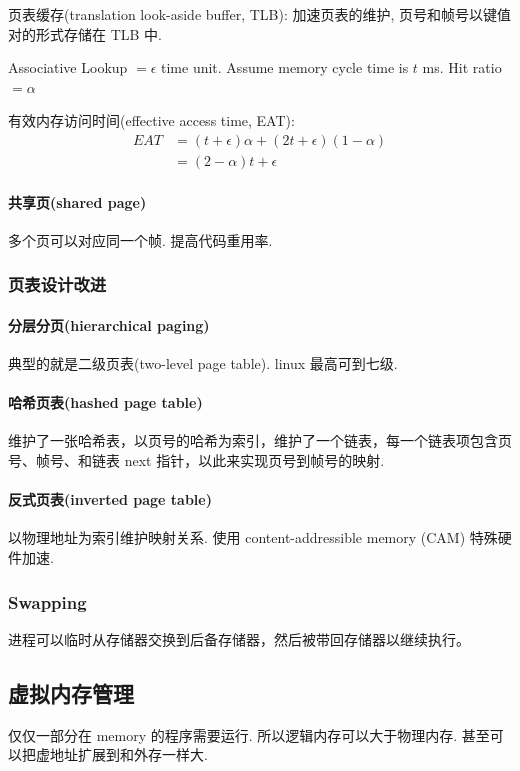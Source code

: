 页表缓存(translation look-aside buffer, TLB): 加速页表的维护, 页号和帧号以键值对的形式存储在 TLB 中. 

Associative Lookup $=\epsilon$ time unit. Assume memory cycle time is $t$ ms. Hit ratio $=\alpha$

有效内存访问时间(effective access time, EAT):
\begin{align*}
    EAT &= (t+\epsilon)\alpha+(2t+\epsilon)(1-\alpha)\\
    &=(2-\alpha)t+\epsilon 
\end{align*}


\paragraph{共享页(shared page)}多个页可以对应同一个帧. 提高代码重用率. 

\subsubsection{页表设计改进}
\paragraph{分层分页(hierarchical paging)}典型的就是二级页表(two-level page table). linux 最高可到七级. 

\paragraph{哈希页表(hashed page table)}维护了一张哈希表，以页号的哈希为索引，维护了一个链表，每一个链表项包含页号、帧号、和链表 next 指针，以此来实现页号到帧号的映射.

\paragraph{反式页表(inverted page table)}以物理地址为索引维护映射关系. 使用 content-addressible memory (CAM) 特殊硬件加速. 

\subsubsection{Swapping}
进程可以临时从存储器交换到后备存储器，然后被带回存储器以继续执行。

\subsection{虚拟内存管理}
仅仅一部分在 memory 的程序需要运行. 所以逻辑内存可以大于物理内存. 甚至可以把虚地址扩展到和外存一样大. 

